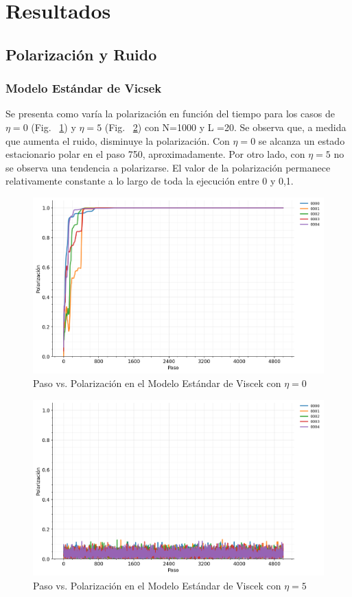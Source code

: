 \documentclass{article}
\begin{document}
\section{Resultados}

\subsection{Polarización y Ruido}
\subsubsection{Modelo Estándar de Vicsek}

Se presenta como varía la polarización en función del tiempo para los casos de \(\eta=0\) (Fig. ~\ref{fig:3}) y \(\eta = 5\) (Fig. ~\ref{fig:4}) con N=1000 y L =20. Se observa que, a medida que aumenta el ruido, disminuye la polarización. Con \(\eta=0\) se alcanza un estado estacionario polar en el paso 750, aproximadamente. Por otro lado, con \(\eta=5\) no se observa una tendencia a polarizarse. El valor de la polarización permanece relativamente constante a lo largo de toda la ejecución entre 0 y 0,1.
\begin{figure}[H]
    \centering
    \includegraphics[width=1\linewidth]{noise-0.000-SVM.png}
    \caption{Paso vs. Polarización en el Modelo Estándar de Viscek con \(\eta =0\)}
    \label{fig:3}
\end{figure}

\begin{figure}[H]
    \centering
    \includegraphics[width=1\linewidth]{noise-5.000-SVM.png}
    \caption{Paso vs. Polarización en el Modelo Estándar de Viscek con \(\eta = 5\)}
    \label{fig:4}
\end{figure}
\end{document}
